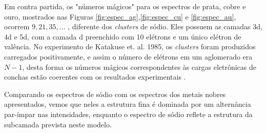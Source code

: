 Em contra partida, os "números mágicos" para os espectros de prata, cobre e ouro, mostrados nas Figuras \ref{fig:espec_ag},\ref{fig:espec_cu} e \ref{fig:espec_au}, ocorrem
$9, 21, 35,...$ , diferente dos \textit{clusters} de sódio. Eles possuem as camadas 3d, 4d e 5d, com a camada d preenchido com 10 elétrons e um único elétron de valência. No experimento de Katakuse et. al. 1985,  os \textit{clusters} foram produzidos carregados positivamente, e assim o número de elétrons em um aglomerado era $N - 1$, desta forma os números mágicos correspondentes às cargas eletrônicas de conchas estão coerentes com os resultados experimentais \cite{Heer}.

Comparando os espectros de sódio com os espectros dos metais nobres apresentados, vemos que neles a estrutura fina é dominada por um alternância par-ímpar nas intensidades, enquanto o espectro de sódio reflete a estrutura da subcamada prevista neste modelo. 





